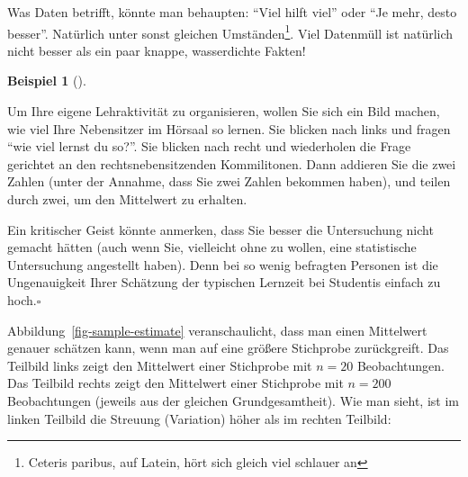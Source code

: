 \documentclass[
  a4paper,
  DIV=11]{scrreprt}
\theoremstyle{definition}
\theoremstyle{definition}
\newtheorem{example}{Beispiel}[chapter]
\theoremstyle{definition}
\theoremstyle{remark}
\begin{document}
Was Daten betrifft, könnte man behaupten: ``Viel hilft viel'' oder ``Je
mehr, desto besser''. Natürlich unter sonst gleichen
Umständen\footnote{Ceteris paribus, auf Latein, hört sich gleich viel
  schlauer an}. Viel Datenmüll ist natürlich nicht besser als ein paar
knappe, wasserdichte Fakten!

\begin{example}[]\protect\hypertarget{exm-samplesize}{}\label{exm-samplesize}

Um Ihre eigene Lehraktivität zu organisieren, wollen Sie sich ein Bild
machen, wie viel Ihre Nebensitzer im Hörsaal so lernen. Sie blicken nach
links und fragen ``wie viel lernst du so?''. Sie blicken nach recht und
wiederholen die Frage gerichtet an den rechtsnebensitzenden
Kommilitonen. Dann addieren Sie die zwei Zahlen (unter der Annahme, dass
Sie zwei Zahlen bekommen haben), und teilen durch zwei, um den
Mittelwert zu erhalten.

Ein kritischer Geist könnte anmerken, dass Sie besser die Untersuchung
nicht gemacht hätten (auch wenn Sie, vielleicht ohne zu wollen, eine
statistische Untersuchung angestellt haben). Denn bei so wenig befragten
Personen ist die Ungenauigkeit Ihrer Schätzung der typischen Lernzeit
bei Studentis einfach zu hoch.\(\square\)

\end{example}

Abbildung~\ref{fig-sample-estimate} veranschaulicht, dass man einen
Mittelwert genauer schätzen kann, wenn man auf eine größere Stichprobe
zurückgreift. Das Teilbild links zeigt den Mittelwert einer Stichprobe
mit \(n=20\) Beobachtungen. Das Teilbild rechts zeigt den Mittelwert
einer Stichprobe mit \(n=200\) Beobachtungen (jeweils aus der gleichen
Grundgesamtheit). Wie man sieht, ist im linken Teilbild die Streuung
(Variation) höher als im rechten Teilbild:
\end{document}
